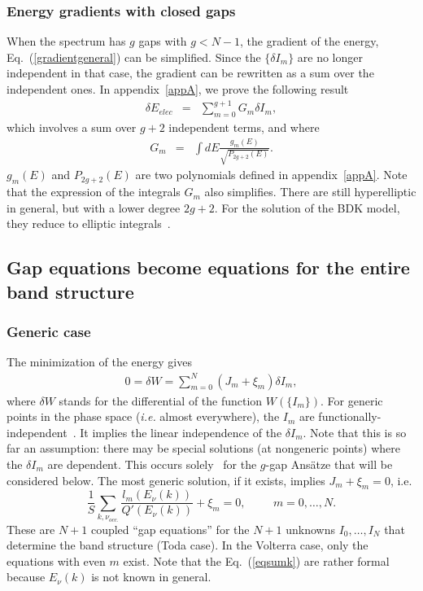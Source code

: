 \documentclass[]{revtex4-1}
\begin{document}
\subsubsection{Energy gradients with closed gaps}

When the spectrum has $g$ gaps with $g<N-1$, the gradient of the energy, Eq.~(\ref{gradientgeneral}) can be simplified. Since the $\{\delta I_m \}$ are no longer independent in that case, the gradient can be rewritten as a sum over the independent ones. In appendix~\ref{appA}, we prove the following result
\begin{eqnarray}
  \delta E_{elec} &=&  \sum_{m=0}^{g+1} G_m  \delta I_m,  \label{gradientsimp10}
\end{eqnarray}
which involves a sum over $g+2$ independent terms, and where
\begin{eqnarray}
G_m &=& \int dE \frac{ g_m(E)  }{\sqrt{P_{2g+2}(E)}}. \label{gradientsimp20} 
\end{eqnarray}
$g_m(E)$ and $P_{2g+2}(E)$ are two polynomials defined in appendix~\ref{appA}. Note that the expression of the integrals $G_m$ also simplifies.  There are still hyperelliptic in general, but with a lower degree $2g+2$. For the solution of the BDK model, they reduce to elliptic integrals~\cite{BDK}.

\subsection{Gap equations become equations for the entire band structure}
\label{gapequations}
\subsubsection{Generic case}

The minimization of the energy gives
\begin{eqnarray}
  0=\delta W = \sum_{m=0}^N (J_m+\xi_m) \delta I_m, \label{geneq}
\end{eqnarray}
where $\delta W$ stands for the differential of the function $W(\{I_m\})$. 
For generic points in the phase space (\textit{i.e.} almost everywhere), the $I_m$ are functionally-independent~\cite{notefi}. It implies the linear independence of the $\delta I_m$. %
Note that this is so far an assumption: there may be special solutions (at nongeneric points) where the $\delta I_m$ are dependent. This occurs solely~\cite{Novikov} for the $g$-gap Ans\"atze that will be considered below. The most generic solution, if it exists, implies $J_m + \xi_m =0$, i.e.
\begin{equation}
\frac{1}{S} \sum_{k, \nu_{occ.}} \frac{l_m(E_{\nu}(k))}{Q'(E_{\nu}(k))}  + \xi_m =0, \hspace{1cm} m=0,\dots,N. \label{eqsumk}
\end{equation}
These are $N+1$ coupled ``gap equations'' for the $N+1$ unknowns $I_0,\dots,I_N$ that determine the band structure (Toda case). In the Volterra case, only the equations with even $m$ exist. Note that the Eq.~(\ref{eqsumk}) are rather formal because $E_{\nu}(k)$ is not known in general.
\end{document}
